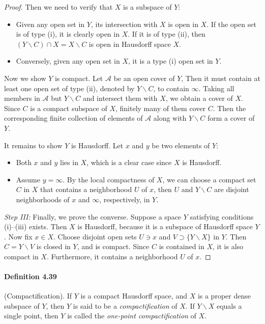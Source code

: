 \documentclass{article}
\numberwithin{equation}{section}
\theoremstyle{plain}
\theoremstyle{definition}
\begin{document}
\begin{proof}
Then we need to verify that $X$ is a subspace of $Y$:
\begin{itemize}
	\item Given any open set in $Y$, its intersection with $X$ is open in $X$. If the open set is of type (i), it is clearly open in $X$. If it is of type (ii), then $(Y\backslash C)\cap X = X\backslash C$ is open in Hausdorff space $X$.
	\item Conversely, given any open set in $X$, it is a type (i) open set in $Y$.
\end{itemize}

Now we show $Y$ is compact. Let $\mathscr{A}$ be an open cover of $Y$, Then it must contain at least one open set of type (ii), denoted by $Y\backslash C$, to contain $\infty$. Taking all members in $\mathscr{A}$ but $Y\backslash C$ and intersect them with $X$, we obtain a cover of $X$. Since $C$ is a compact subspace of $X$, finitely many of them cover $C$. Then the corresponding finite collection of elements of $\mathscr{A}$ along with $Y\backslash C$ form a cover of $Y$.

It remains to show $Y$ is Hausdorff. Let $x$ and $y$ be two elements of $Y$:
\begin{itemize}
	\item Both $x$ and $y$ lies in $X$, which is a clear case since $X$ is Hausdorff.
	\item Assume $y=\infty$. By the local compactness of $X$, we can choose a compact set $C$ in $X$ that contains a neighborhood $U$ of $x$, then $U$ and $Y\backslash C$ are disjoint neighborhoods of $x$ and $\infty$, respectively, in $Y$.
\end{itemize}

\vspace{0.2cm}
\textit{Step III:} Finally, we prove the converse. Suppose a space $Y$ satisfying conditions (i)–(iii) exists. Then $X$ is Hausdorff, because it is a subspace of Hausdorff space $Y$. Now fix $x\in X$. Choose disjoint open sets $U\ni x$ and $V\supset\{Y\backslash X\}$ in $Y$. Then $C=Y\backslash V$ is closed in $Y$, and is compact. Since $C$ is contained in $X$, it is also compact in $X$. Furthermore, it contains a neighborhood $U$ of $x$.
\end{proof}

\paragraph{Definition 4.39\label{def:4.39}} (Compactification). If $Y$ is a compact Hausdorff space, and $X$ is a proper dense subspace of $Y$, then $Y$ is said to be a \textit{compactification} of $X$. If $Y\backslash X$ equals a single point, then $Y$ is called the \textit{one-point compactification} of $X$.
\end{document}

